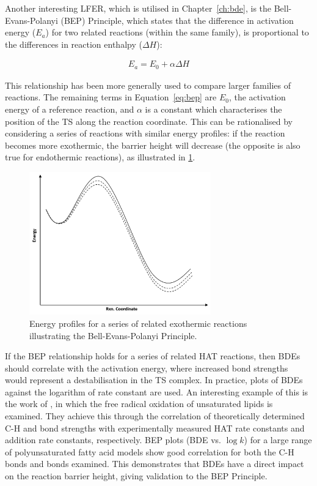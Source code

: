 Another interesting LFER, which is utilised in Chapter~\ref{ch:bde}, is the
Bell-Evans-Polanyi (BEP) Principle,\cite{Bell1936,Evans1938} which states that
the difference in activation energy ($E_a$) for two related reactions (within
the same family), is proportional to the differences in reaction enthalpy
($\Delta H$):

\begin{align}
  E_a = E_0 + \alpha \Delta H
  \label{eq:bep}
\end{align}

\noindent This relationship has been more generally used to compare larger
families of reactions. The remaining terms in Equation~\ref{eq:bep} are $E_0$,
the activation energy of a reference reaction, and $\alpha$ is a constant which
characterises the position of the TS along the reaction coordinate. This can be
rationalised by considering a series of reactions with similar energy profiles:
if the reaction becomes more exothermic, the barrier height will decrease (the
opposite is also true for endothermic reactions), as illustrated in
\ref{fig:bep}.

\begin{figure}[htb]
  \centering
  \includegraphics[width=0.7\textwidth]{figures/bep}
  \caption{Energy profiles for a series of related exothermic reactions
    illustrating the Bell-Evans-Polanyi Principle.}
\label{fig:bep}
\end{figure}

If the BEP relationship holds for a series of related HAT reactions, then BDEs
should correlate with the activation energy, where increased bond strengths
would represent a destabilisation in the TS complex. In practice, plots of BDEs
against the logarithm of rate constant are used. An interesting example of this
is the work of \citet{Pratt2003}, in which the free radical oxidation of
unsaturated lipids is examined. They achieve this through the correlation of
theoretically determined C-H and  bond strengths with experimentally
measured HAT rate constants and  addition rate constants,
respectively. BEP plots (BDE vs. $\log k$) for a large range of polyunsaturated
fatty acid models show good correlation for both the C-H bonds and 
bonds examined. This demonstrates that BDEs have a direct impact on the reaction
barrier height, giving validation to the BEP Principle.

